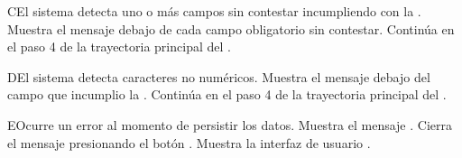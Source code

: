\begin{UCtrayectoriaA}{C}{El sistema detecta uno o más campos sin contestar incumpliendo con la .}
	\UCpaso Muestra el mensaje  debajo de cada campo obligatorio sin contestar.
	\UCpaso Continúa en el paso 4 de la trayectoria principal del .
\end{UCtrayectoriaA}

\begin{UCtrayectoriaA}{D}{El sistema detecta caracteres no numéricos.}
	\UCpaso Muestra el mensaje  debajo del campo que incumplio la .
	\UCpaso Continúa en el paso 4 de la trayectoria principal del .
\end{UCtrayectoriaA}

\begin{UCtrayectoriaA}{E}{Ocurre un error al momento de persistir los datos.}
	\UCpaso Muestra el mensaje .
	\UCpaso[\UCactor] Cierra el mensaje presionando el botón .
	\UCpaso Muestra la interfaz de usuario .
\end{UCtrayectoriaA}


